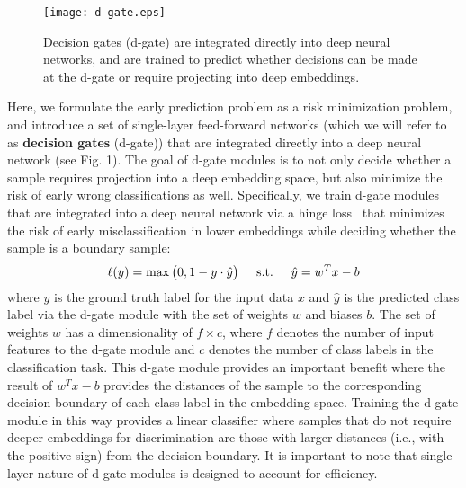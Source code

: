 \documentclass{article}
\begin{document}
\begin{figure}
\vspace{-1.2cm}
    \centering
    \texttt{[image: d-gate.eps]}
    \vspace{-0.15 cm}
    \caption{\footnotesize Decision gates (d-gate) are integrated directly into deep neural networks, and are trained to predict whether decisions can be made at the d-gate or require projecting into deep embeddings.}
    \label{fig:my_label}
    \vspace{-0.2in}
\end{figure}
Here, we formulate the early prediction problem as a risk minimization problem, and introduce a set of single-layer feed-forward networks (which we will refer to as \textbf{decision gates} (d-gate)) that are integrated directly into a deep neural network (see Fig. 1).  The goal of d-gate modules is to not only decide whether a sample requires projection into a deep embedding space, but also minimize the risk of early wrong classifications as well.  Specifically, we train d-gate modules that are integrated into a deep neural network via a hinge loss~\cite{dogan2016unified} that minimizes the risk of early misclassification in lower embeddings while deciding whether the sample is a boundary sample:
\begin{align}
\vspace{-1 cm}
    \ell(y) = \max \big(0, 1- y \cdot \hat{y} \big) \hspace{0.5 cm} \text{s.t.} \hspace{0.5 cm} \hat{y} = w^Tx-b
\end{align}
where $y$ is the ground truth label for the input data $x$ and $\hat{y}$ is the predicted class label via the  d-gate module with the set of weights $w$ and biases $b$.  The set of weights $w$ has a dimensionality of $f \times c$, where $f$ denotes the number of input features to the d-gate module and $c$ denotes the number of class labels in the classification task. This d-gate module provides an important benefit where the result of $w^Tx-b$ provides the distances of the sample to the corresponding decision boundary of each class label in the embedding space.  Training the d-gate module in this way provides a linear classifier where samples that do not require deeper embeddings for discrimination are those with larger distances (i.e., with the positive sign) from the decision boundary.  It is important to note that single layer nature of d-gate modules is designed to account for efficiency.
\end{document}
